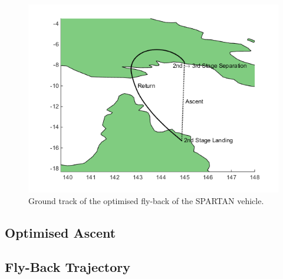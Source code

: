 \documentclass{article}
\begin{document}
\begin{figure}[ht]
	\centering
	\includegraphics[width=0.6\linewidth]{Figures/lon-lat}
	\caption{Ground track of the optimised fly-back of the SPARTAN vehicle.}
	\label{fig:lon-lat}
\end{figure} 

\subsection{Optimised Ascent}

\subsection{Fly-Back Trajectory}
 
\end{document}
